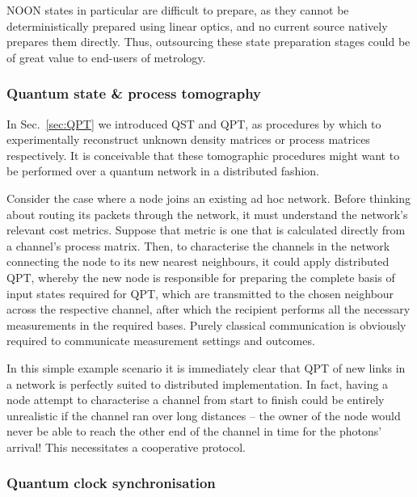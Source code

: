 \documentclass[aps,rmp,twocolumn,amsmath,amssymb,nofootinbib,superscriptaddress,longbibliography,floatfix,table-of-contents,eqsecnum]{revtex4-1}
\begin{document}
NOON states in particular are difficult to prepare, as they cannot be deterministically prepared using linear optics, and no current source natively prepares them directly. Thus, outsourcing these state preparation stages could be of great value to end-users of metrology.

\cite{DomBerry}

%
%

\subsubsection{Quantum state \& process tomography}  

In Sec.~\ref{sec:QPT} we introduced QST and QPT, as procedures by which to experimentally reconstruct unknown density matrices or process matrices respectively. It is conceivable that these tomographic procedures might want to be performed over a quantum network in a distributed fashion.

Consider the case where a node joins an existing ad hoc network. Before thinking about routing its packets through the network, it must understand the network's relevant cost metrics. Suppose that metric is one that is calculated directly from a channel's process matrix. Then, to characterise the channels in the network connecting the node to its new nearest neighbours, it could apply distributed QPT, whereby the new node is responsible for preparing the complete basis of input states required for QPT, which are transmitted to the chosen neighbour across the respective channel, after which the recipient performs all the necessary measurements in the required bases. Purely classical communication is obviously required to communicate measurement settings and outcomes.

In this simple example scenario it is immediately clear that QPT of new links in a network is perfectly suited to distributed implementation. In fact, having a node attempt to characterise a channel from start to finish could be entirely unrealistic if the channel ran over long distances -- the owner of the node would never be able to reach the other end of the channel in time for the photons' arrival! This necessitates a cooperative protocol.

%
%

\subsubsection{Quantum clock synchronisation} 
\end{document}
